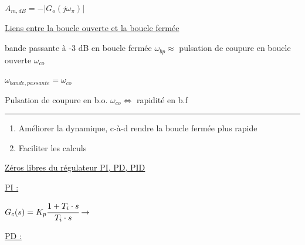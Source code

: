 \documentclass[	DIV=calc,%
							paper=a4,%
							fontsize=11pt,%
							twocolumn]{scrartcl} %
\newcommand{\hformbar}[1]{\bigskip\hrule\vspace{5pt}} %
\newcounter{mycounter}
\newcommand{\formdesc}[1]{\noindent\textbf{#1} \addtocounter{mycounter}{1} \hfill \themycounter}
\newcommand{\formtitle}[1]{\noindent\underline{#1}}
\begin{document}
$A_{m,dB} = -|G_o(j\omega_{\pi})| $\quad  [dB]

\vspace{3mm}

\formtitle{Liens entre la boucle ouverte et la boucle fermée} 

bande passante à -3 dB en boucle fermée $\omega_{bp} \approx$ pulsation de coupure en boucle ouverte $\omega_{co}$

$\omega_{bande,passante} = \omega_{co}$

Pulsation de coupure en b.o. $\omega_{co} \Leftrightarrow $ rapidité en b.f

\hformbar

\formdesc{Compensation du pôle dominant}

\begin{enumerate}
    \item Améliorer la dynamique, c-à-d rendre la boucle fermée plus rapide
    \item Faciliter les calculs
\end{enumerate}

\formtitle{Zéros libres du régulateur PI, PD, PID} 


\vspace{2mm}

\underline{PI :}

\vspace{2mm}

{\noindent$G_c(s) = K_p \cfrac{1+T_i \cdot s}{T_i \cdot s} \rightarrow$}

\begin{figure}
    \begin{center}
        \vspace{-3.7cm}
    \end{center}
  \end{figure}

  \vspace{10mm}

\underline{PD :}

\vspace{2mm}
\end{document}
